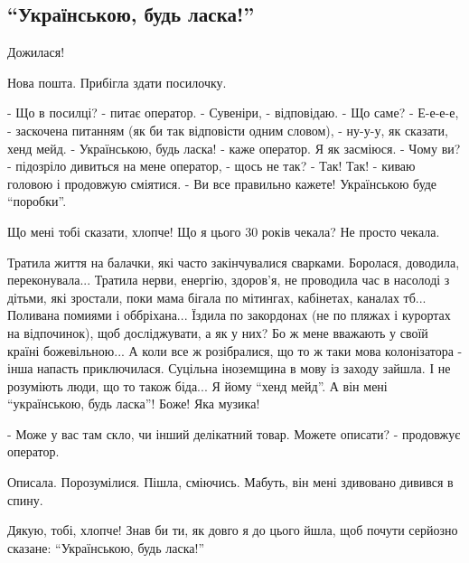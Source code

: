  
 
 
 
 
 
\subsection{\enquote{Українською, будь ласка!}}
\label{sec:25_11_2020.fb.nitsoi_larysa.1.nova_poshta}

Дожилася!

Нова пошта. Прибігла здати посилочку.

	\obeycr
- Що в посилці? - питає оператор.
- Сувеніри, - відповідаю.
- Що саме?
- Е-е-е-е, - заскочена питанням (як би так відповісти одним словом), - ну-у-у, як сказати, хенд мейд.
- Українською, будь ласка! - каже оператор.
Я як засміюся.
- Чому ви? - підозріло дивиться на мене оператор, - щось не так?
- Так! Так! - киваю головою і продовжую сміятися. - Ви все правильно кажете! Українською буде \enquote{поробки}.
	\restorecr

Що мені тобі сказати, хлопче! Що я цього 30 років чекала? Не просто чекала.

Тратила життя на балачки, які часто закінчувалися сварками. Боролася, доводила,
переконувала...  Тратила нерви, енергію, здоров'я, не проводила час в насолоді
з дітьми, які зростали, поки мама бігала по мітингах, кабінетах, каналах тб...
Поливана помиями і оббріхана... Їздила по закордонах (не по пляжах і курортах
на відпочинок), щоб досліджувати, а як у них? Бо ж мене вважають у своїй країні
божевільною... А коли все ж розібралися, що то ж таки мова колонізатора - інша
напасть приключилася. Суцільна іноземщина в мову із заходу зайшла. І не
розуміють люди, що то також біда...  Я йому \enquote{хенд мейд}. А він мені
\enquote{українською, будь ласка}! Боже! Яка музика!

- Може у вас там скло, чи інший делікатний товар. Можете описати? - продовжує оператор.

Описала. Порозумілися. Пішла, сміючись. Мабуть, він мені здивовано дивився в спину. 

Дякую, тобі, хлопче! Знав би ти, як довго я до цього йшла, щоб почути серйозно сказане: \enquote{Українською, будь ласка!}

